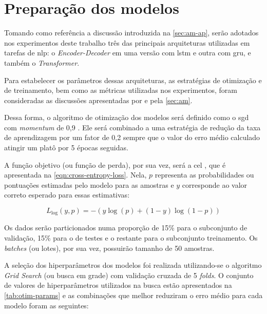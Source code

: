 \section{Preparação dos modelos}
\label{sec:metodos-preparacao-modelos}


Tomando como referência a discussão introduzida na \autoref{sec:am-ap}, serão adotados nos experimentos deste trabalho três das principais arquiteturas utilizadas em tarefas de \acrfull{nlp}: o \textit{Encoder-Decoder} em uma versão com \acrfull{lstm} e outra com \acrfull{gru}, e também o \textit{Transformer}.

Para estabelecer os parâmetros dessas arquiteturas, as estratégias de otimização e de treinamento, bem como as métricas utilizadas nos experimentos, foram consideradas as discussões apresentadas por  e pela \autoref{sec:am}.

Dessa forma, o algoritmo de otimização dos modelos será definido como o \acrfull{sgd} com \textit{momentum} de 0,9 \cite{robbins-2007-stochastic}. Ele será combinado a uma estratégia de redução da taxa de aprendizagem por um fator de 0,2 sempre que o valor do erro médio calculado atingir um platô por 5 épocas seguidas.

A função objetivo (ou função de perda), por sua vez, será a \acrfull{cel} \cite{mitchell-1997-ml}, que é apresentada na \autoref{eqn:cross-entropy-loss}. Nela, \(p\) representa as probabilidades ou pontuações estimadas pelo modelo para as amostras e \(y\) corresponde ao valor correto esperado para essas estimativas:

\begin{equation}
    \label{eqn:cross-entropy-loss}
    L_{\log}(y, p) = -(y \log (p) + (1 - y) \log (1 - p))
\end{equation}


Os dados serão particionados numa proporção de 15\% para o subconjunto de validação, 15\% para o de testes e o restante para o subconjunto treinamento. Os \textit{batches} (ou lotes), por sua vez, possuirão tamanho de 50 amostras.



A seleção dos hiperparâmetros dos modelos foi realizada utilizando-se o algoritmo \textit{Grid Search} (ou busca em grade) com validação cruzada de 5 \textit{folds}. O conjunto de valores de hiperparâmetros utilizados na busca estão apresentados na \autoref{tab:otim-params} e as combinações que melhor reduziram o erro médio para cada modelo foram as seguintes:


